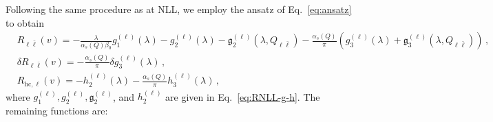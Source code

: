 Following the same procedure as at NLL, we employ the ansatz of
Eq.~\eqref{eq:ansatz} to obtain
\begin{subequations}
\begin{align}
	&R_{\ell\bar\ell}(v)=-\frac{\lambda}{\alpha_s(Q)\beta_0}g_1^{(\ell)}(\lambda)-g_2^{(\ell)}(\lambda)-\mathfrak{g}_2^{(\ell)}(\lambda,Q_{\ell\bar\ell})-\frac{\alpha_s(Q)}{\pi}\left(g_3^{(\ell)}(\lambda)+\mathfrak{g}_3^{(\ell)}(\lambda,Q_{\ell\bar\ell})\right)\,,\\
	&\delta R_{\ell\bar\ell}(v)=-\frac{\alpha_s(Q)}{\pi}\delta g_3^{(\ell)}(\lambda)\,,\\
	&R_{\mathrm{hc},\ell}(v)=-h_2^{(\ell)}(\lambda)-\frac{\alpha_s(Q)}{\pi}h_3^{(\ell)}(\lambda)\,,
\end{align}
\end{subequations}
where $g_1^{(\ell)}, g_2^{(\ell)}, \mathfrak{g}_2^{(\ell)}$, and
$h_2^{(\ell)}$ are given in Eq.~\eqref{eq:RNLL-g-h}. The remaining functions are:

